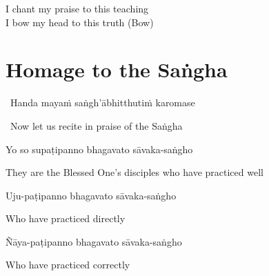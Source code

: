 \begin{english}
  I chant my praise to this teaching\\
  I bow my head to this truth \hfill{\textnormal{\ifafiveversion\fontsize{12.5}{18}\fi\ifasixversion\fontsize{9}{13}\fi\selectfont (Bow)}}
\end{english}

\suttaRef{[Trad]}



\section{Homage to the Saṅgha}
\label{homage-sangha}

\begin{leader}
  \anglebracketleft\ \hspace{-0.5mm}Handa mayaṁ saṅgh'ābhitthutiṁ karomase \hspace{-0.5mm}\anglebracketright\
\end{leader}
\begin{leader-english-belowpali}
  \anglebracketleft\ \hspace{-0.5mm}Now let us recite in praise of the Saṅgha \hspace{-0.5mm}\anglebracketright\
\end{leader-english-belowpali}

Yo so supaṭipanno bhagavato sāvaka-saṅgho

\begin{english}
  They are the Blessed One's disciples who have practiced well
\end{english}

Uju-paṭipanno bhagavato sāvaka-saṅgho

\begin{english}
  Who have practiced directly\makeatletter\hyperlink{endnote5-appendix}\makeatother

\end{english}

Ñāya-paṭipanno bhagavato sāvaka-saṅgho

\begin{english}
  Who have practiced correctly\ifdigitalversion\makeatletter\hyperlink{endnote6-appendix}\makeatother\fi

\end{english}

